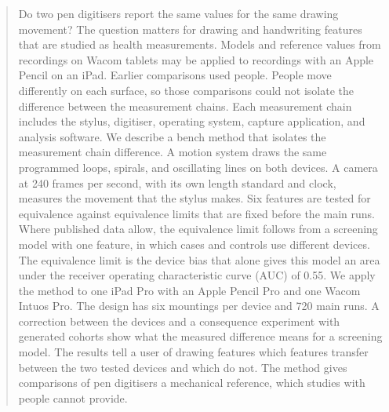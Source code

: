 \begin{abstract}
Do two pen digitisers report the same values for the same drawing movement?
The question matters for drawing and handwriting features that are studied as health measurements.
Models and reference values from recordings on Wacom tablets may be applied to recordings with an Apple Pencil on an iPad.
Earlier comparisons used people.
People move differently on each surface, so those comparisons could not isolate the difference between the measurement chains.
Each measurement chain includes the stylus, digitiser, operating system, capture application, and analysis software.
We describe a bench method that isolates the measurement chain difference.
A motion system draws the same programmed loops, spirals, and oscillating lines on both devices.
A camera at 240 frames per second, with its own length standard and clock, measures the movement that the stylus makes.
Six features are tested for equivalence against equivalence limits that are fixed before the main runs.
Where published data allow, the equivalence limit follows from a screening model with one feature, in which cases and controls use different devices.
The equivalence limit is the device bias that alone gives this model an area under the receiver operating characteristic curve (AUC) of 0.55.
We apply the method to one iPad Pro with an Apple Pencil Pro and one Wacom Intuos Pro.
The design has six mountings per device and 720 main runs.
A correction between the devices and a consequence experiment with generated cohorts show what the measured difference means for a screening model.
The results tell a user of drawing features which features transfer between the two tested devices and which do not.
The method gives comparisons of pen digitisers a mechanical reference, which studies with people cannot provide.
\end{abstract}
